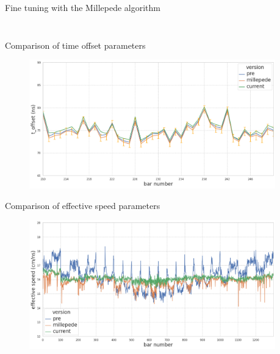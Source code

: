 \documentclass{ikpKoeln}
\begin{document}
\begin{frame}[t]{Fine tuning with the Millepede algorithm}
\begin{columns}[t]
\begin{column}[t]{0.48 \textwidth}
\begin{figure}[t]
			\end{figure}
		\end{column}
	\end{columns}
\end{frame}

\begin{frame}{Comparison of time offset parameters}
	\begin{figure}[t]
		\includegraphics[width = 0.95\textwidth]{R3BCon2024GSI/toffset_comp.png}
	\end{figure}
\end{frame}

\begin{frame}{Comparison of effective speed parameters}
	\begin{figure}[t]
		\includegraphics[width = 0.95\textwidth]{R3BCon2024GSI/effective_c_comp.png}
	\end{figure}
\end{frame}
\end{document}
